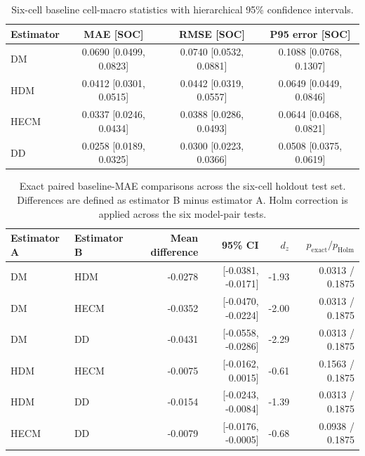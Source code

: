 \begin{table}[H]
\centering
\footnotesize
\setlength{\tabcolsep}{3pt}
\caption[Baseline cell-macro statistics.]{Six-cell baseline cell-macro statistics with hierarchical 95\% confidence intervals.}
\label{tab:robustness_appendix_baseline_metrics}
\begin{tabular}{lccc}
\toprule
Estimator & MAE [SOC] & RMSE [SOC] & P95 error [SOC] \\
\midrule
DM   & 0.0690 [0.0499, 0.0823] & 0.0740 [0.0532, 0.0881] & 0.1088 [0.0768, 0.1307] \\
HDM  & 0.0412 [0.0301, 0.0515] & 0.0442 [0.0319, 0.0557] & 0.0649 [0.0449, 0.0846] \\
HECM & 0.0337 [0.0246, 0.0434] & 0.0388 [0.0286, 0.0493] & 0.0644 [0.0468, 0.0821] \\
DD   & 0.0258 [0.0189, 0.0325] & 0.0300 [0.0223, 0.0366] & 0.0508 [0.0375, 0.0619] \\
\bottomrule
\end{tabular}
\end{table}

\begin{table}[H]
\centering
\footnotesize
\setlength{\tabcolsep}{3pt}
\caption[Paired baseline-MAE comparisons.]{Exact paired baseline-MAE comparisons across the six-cell holdout test set. Differences are defined as estimator B minus estimator A. Holm correction is applied across the six model-pair tests.}
\label{tab:robustness_appendix_baseline_pair_tests}
\begin{tabular}{llrrrr}
\toprule
Estimator A & Estimator B & Mean difference & 95\% CI & $d_z$ & $p_{\mathrm{exact}}/p_{\mathrm{Holm}}$ \\
\midrule
DM   & HDM  & -0.0278 & [-0.0381, -0.0171] & -1.93 & 0.0313 / 0.1875 \\
DM   & HECM & -0.0352 & [-0.0470, -0.0224] & -2.00 & 0.0313 / 0.1875 \\
DM   & DD   & -0.0431 & [-0.0558, -0.0286] & -2.29 & 0.0313 / 0.1875 \\
HDM  & HECM & -0.0075 & [-0.0162,  0.0015] & -0.61 & 0.1563 / 0.1875 \\
HDM  & DD   & -0.0154 & [-0.0243, -0.0084] & -1.39 & 0.0313 / 0.1875 \\
HECM & DD   & -0.0079 & [-0.0176, -0.0005] & -0.68 & 0.0938 / 0.1875 \\
\bottomrule
\end{tabular}
\end{table}

